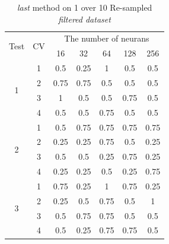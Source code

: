 \documentclass[draft,dvipsnames]{drexel-thesis}
\begin{document}
\begin{thesis}
\begin{table}[!t]
\centering
\caption{{\em last} method on 1 over 10 Re-sampled {\em filtered dataset}}
\label{tbl:last_1_10}
\begin{tabular}{|c|c|c|c|c|c|c|}
\hline
\multirow{2}{*}{Test} & \multirow{2}{*}{CV} & \multicolumn{5}{c|}{The number of neurans}                               \\ \cline{3-7}
                      &                     & 16           & 32           & 64           & 128          & 256          \\ \hline
\multirow{4}{*}{1}    & 1                   & 0.5          & 0.25         & 1            & 0.5          & 0.5          \\ \cline{2-7}
                      & 2                   & 0.75         & 0.75         & 0.5          & 0.5          & 0.5          \\ \cline{2-7}
                      & 3                   & 1            & 0.5          & 0.5          & 0.75         & 0.5          \\ \cline{2-7}
                      & 4                   & 0.5          & 0.5          & 0.75         & 0.5          & 0.5          \\ \hline
\multirow{4}{*}{2}    & 1                   & 0.5          & 0.75         & 0.75         & 0.75         & 0.75         \\ \cline{2-7}
                      & 2                   & 0.25         & 0.25         & 0.75         & 0.5          & 0.25         \\ \cline{2-7}
                      & 3                   & 0.5          & 0.5          & 0.25         & 0.75         & 0.25         \\ \cline{2-7}
                      & 4                   & 0.25         & 0.25         & 0.5          & 0.25         & 0.75         \\ \hline
\multirow{4}{*}{3}    & 1                   & 0.75         & 0.25         & 1            & 0.75         & 0.25         \\ \cline{2-7}
                      & 2                   & 0.25         & 0.5          & 0.75         & 0.5          & 1            \\ \cline{2-7}
                      & 3                   & 0.5          & 0.75         & 0.75         & 0.5          & 0.5          \\ \cline{2-7}
                      & 4                   & 0.5          & 0.25         & 0.75         & 0.75         & 0.5          \\ \hline

\end{tabular}
\end{table}
\end{thesis}
\end{document}
